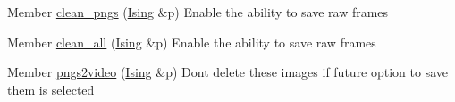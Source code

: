 
\begin{DoxyRefList}
\item[Member \mbox{\hyperlink{clean_8cpp_a802e1acb2af3372b538bbbc8fe81951a}{clean\+\_\+pngs}} (\mbox{\hyperlink{class_ising}{Ising}} \&p)]\label{todo__todo000001}%
%
Enable the ability to save raw frames 
\item[Member \mbox{\hyperlink{clean_8cpp_a60e30df0e91f0a388e9804b69971a439}{clean\+\_\+all}} (\mbox{\hyperlink{class_ising}{Ising}} \&p)]\label{todo__todo000002}%
%
Enable the ability to save raw frames 
\item[Member \mbox{\hyperlink{pngs2video_8cpp_abac3179f177c996a7f74e2a2e8187756}{pngs2video}} (\mbox{\hyperlink{class_ising}{Ising}} \&p)]\label{todo__todo000003}%
%
Don\textquotesingle{}t delete these images if future option to save them is selected
\end{DoxyRefList}